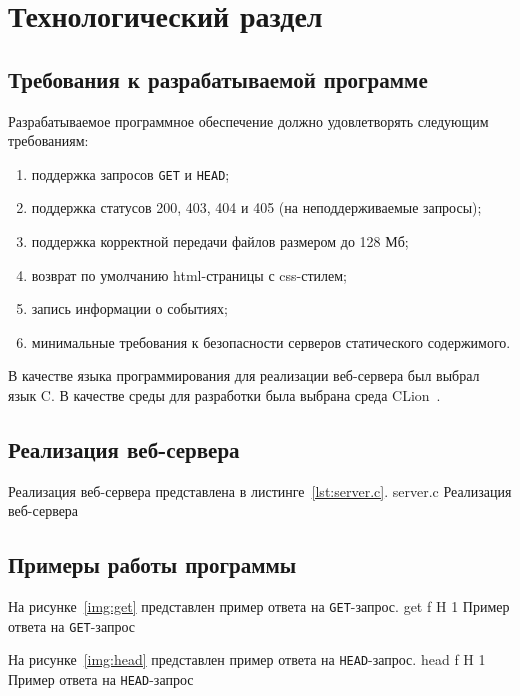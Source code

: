 \chapter{Технологический раздел}

\section{Требования к разрабатываемой программе}

Разрабатываемое программное обеспечение должно удовлетворять следующим требованиям:
\begin{enumerate}[leftmargin=1.6\parindent]
	\item поддержка запросов \texttt{GET} и \texttt{HEAD};
	\item поддержка статусов 200, 403, 404 и 405 (на неподдерживаемые запросы);
	\item поддержка корректной передачи файлов размером до 128 Мб;
	\item возврат по умолчанию html-страницы с css-стилем;
	\item запись информации о событиях;
	\item минимальные требования к безопасности серверов статического содержимого.
\end{enumerate}

В качестве языка программирования для реализации веб-сервера был выбрал язык C.
В качестве среды для разработки была выбрана среда CLion~\cite{c, clion}.

\clearpage
\section{Реализация веб-сервера}

Реализация веб-сервера представлена в листинге~\ref{lst:server.c}.
	{server.c}
	{Реализация веб-сервера}

\section{Примеры работы программы}

На рисунке~\ref{img:get} представлен пример ответа на \texttt{GET}-запрос.
	{get}
	{f}
	{H}
	{1\textwidth}
	{Пример ответа на \texttt{GET}-запрос}

\clearpage
На рисунке~\ref{img:head} представлен пример ответа на \texttt{HEAD}-запрос.
	{head}
	{f}
	{H}
	{1\textwidth}
	{Пример ответа на \texttt{HEAD}-запрос}

